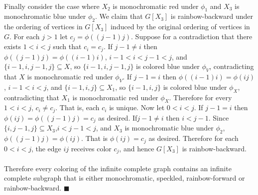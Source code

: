 \documentclass[letterpaper,12pt,oneside,onecolumn]{article}
\begin{document}
\paragraph{}
Finally consider the case where $X_2$ is monochromatic red under $\phi_1$ and $X_3$ is monochromatic blue under $\phi_2$. We claim that $G[X_3]$ is rainbow-backward under the ordering of vertices in $G[X_3]$ induced by the original ordering of vertices in $G$. For each $j>1$ let $c_j = \phi((j-1)j)$. Suppose for a contradiction that there exists $1<i<j$ such that $c_i = c_j$. If $j-1 \neq i$ then $\phi((j-1)j) = \phi((i-1)i)$, $i-1<i<j-1<j$, and $\{i-1,i,j-1,j\} \subseteq X$, so $\{i-1,i,j-1,j\}$ is colored blue under $\phi_V$, contradicting that $X$ is monochromatic red under $\phi_V$. If $j-1 = i$ then $\phi((i-1)i) = \phi(ij)$, $i-1<i<j$, and $\{i-1,i,j\} \subseteq X_1$, so $\{i-1,i,j\}$ is colored blue under $\phi_X$, contradicting that $X_1$ is monochromatic red under $\phi_X$. Therefore for every $1<i<j$, $c_i \neq c_j$. That is, each $c_i$ is unique. Now let $0<i<j$. If $j-1=i$ then $\phi(ij) = \phi((j-1)j) = c_j$ as desired. If$j-1 \neq i$ then $i<j-1$. Since $\{i,j-1,j\} \subseteq X_3$,$i<j-1<j$, and $X_3$ is monochromatic blue under $\phi_2$, $\phi((j-1)j) = \phi(ij)$. That is $\phi(ij) = c_j$ as desired. Therefore for each $0<i<j$, the edge $ij$ receives color $c_j$, and hence $G[X_3]$ is rainbow-backward.
\paragraph{}
Therefore every coloring of the infinite complete graph contains an infinite complete subgraph that is either monochromatic, speckled, rainbow-forward or rainbow-backward. $\blacksquare$
\end{document}
